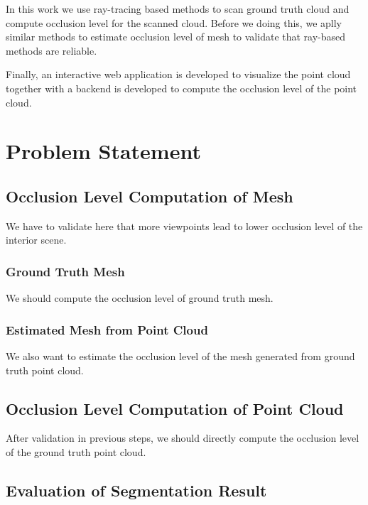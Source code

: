 \documentclass[11pt, a4paper,oneside,chapterprefix=false]{scrbook}
\begin{document}
In this work we use ray-tracing based methods to scan ground truth cloud and compute occlusion level for the scanned cloud. Before we doing this, we aplly similar methods to estimate occlusion level of mesh to validate that ray-based methods are reliable.

Finally, an interactive web application is developed to visualize the point cloud together with a backend is developed to compute the occlusion level of the point cloud.


\chapter{Problem Statement} \label{chp:problem}



\section{Occlusion Level Computation of Mesh} \label{sec:occlusion}

We have to validate here that more viewpoints lead to lower occlusion level of the interior scene.

\subsection{Ground Truth Mesh} \label{subsec:occlusion}

We should compute the occlusion level of ground truth mesh.

\subsection{Estimated Mesh from Point Cloud} \label{subsec:occlusion}

We also want to estimate the occlusion level of the mesh generated from ground truth point cloud.

\section{Occlusion Level Computation of Point Cloud} \label{sec:occlusion}

After validation in previous steps, we should directly compute the occlusion level of the ground truth point cloud.

\section{Evaluation of Segmentation Result} \label{sec:evaluation}
\end{document}

